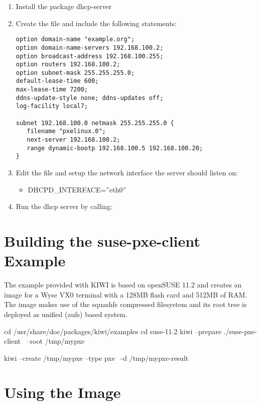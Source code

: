 \begin{enumerate}
\item Install the package dhcp-server
\item Create the file  and include the following
      statements:
 
\begin{verbatim}
option domain-name "example.org";
option domain-name-servers 192.168.100.2;
option broadcast-address 192.168.100.255;
option routers 192.168.100.2;
option subnet-mask 255.255.255.0;
default-lease-time 600;
max-lease-time 7200;
ddns-update-style none; ddns-updates off;
log-facility local7;

subnet 192.168.100.0 netmask 255.255.255.0 {
   filename "pxelinux.0";
   next-server 192.168.100.2;
   range dynamic-bootp 192.168.100.5 192.168.100.20;
}
\end{verbatim}

\item Edit the file  and setup the network
      interface the server should listen on:
      \begin{itemize}
      \item DHCPD\_INTERFACE=''eth0''
      \end{itemize}
\item Run the dhcp server by calling:
\end{enumerate}

\section{Building the suse-pxe-client Example}

The example provided with KIWI is based on openSUSE 11.2 and creates an
image for a Wyse VX0 terminal with a 128MB flash card and 512MB of RAM.
The image makes use of the squashfs compressed filesystem and its
root tree is deployed as unified (aufs) based system. 

\begin{Command}{12cm}
cd /usr/share/doc/packages/kiwi/examples
cd suse-11.2
kiwi --prepare ./suse-pxe-client \
     --root /tmp/mypxe

kiwi --create /tmp/mypxe --type pxe \
     -d /tmp/mypxe-result
\end{Command}

\section{Using the Image}

